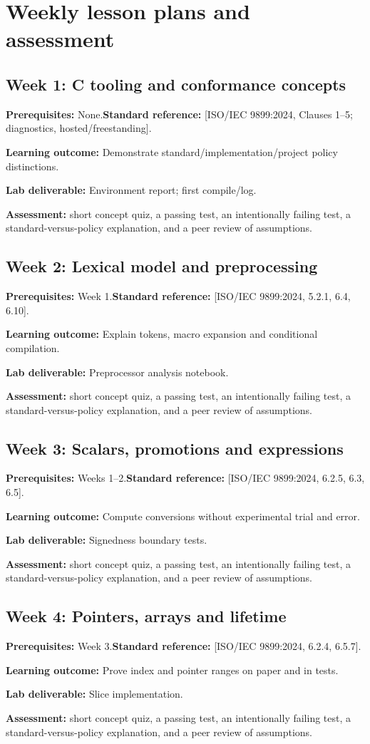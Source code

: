 \documentclass[10pt,letterpaper,oneside]{report}
\newcommand{\refcl}[1]{\textsf{\footnotesize[ISO/IEC 9899:2024, #1]}}
\begin{document}
\chapter{Weekly lesson plans and assessment}
\section{Week 1: C tooling and conformance concepts}
\textbf{Prerequisites:} None.\quad \textbf{Standard reference:} \refcl{Clauses 1--5; diagnostics, hosted/freestanding}.\par\textbf{Learning outcome:} Demonstrate standard/implementation/project policy distinctions.\par\textbf{Lab deliverable:} Environment report; first compile/log.\par\textbf{Assessment:} short concept quiz, a passing test, an intentionally failing test, a standard-versus-policy explanation, and a peer review of assumptions.

\section{Week 2: Lexical model and preprocessing}
\textbf{Prerequisites:} Week 1.\quad \textbf{Standard reference:} \refcl{5.2.1, 6.4, 6.10}.\par\textbf{Learning outcome:} Explain tokens, macro expansion and conditional compilation.\par\textbf{Lab deliverable:} Preprocessor analysis notebook.\par\textbf{Assessment:} short concept quiz, a passing test, an intentionally failing test, a standard-versus-policy explanation, and a peer review of assumptions.

\section{Week 3: Scalars, promotions and expressions}
\textbf{Prerequisites:} Weeks 1--2.\quad \textbf{Standard reference:} \refcl{6.2.5, 6.3, 6.5}.\par\textbf{Learning outcome:} Compute conversions without experimental trial and error.\par\textbf{Lab deliverable:} Signedness boundary tests.\par\textbf{Assessment:} short concept quiz, a passing test, an intentionally failing test, a standard-versus-policy explanation, and a peer review of assumptions.

\section{Week 4: Pointers, arrays and lifetime}
\textbf{Prerequisites:} Week 3.\quad \textbf{Standard reference:} \refcl{6.2.4, 6.5.7}.\par\textbf{Learning outcome:} Prove index and pointer ranges on paper and in tests.\par\textbf{Lab deliverable:} Slice implementation.\par\textbf{Assessment:} short concept quiz, a passing test, an intentionally failing test, a standard-versus-policy explanation, and a peer review of assumptions.
\end{document}

